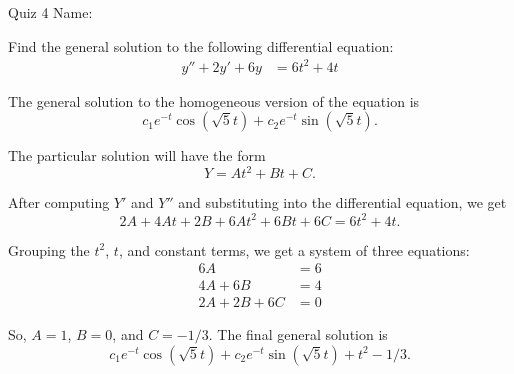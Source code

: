 \documentclass[answers,addpoints,12pt]{exam}
\begin{document}
\noindent
Quiz 4 \hfill Name: \hrulefill

\bigskip\bigskip


\noindent Find the general solution to the following differential equation:
\begin{align*}
	y'' + 2y' + 6y &=  6t^2+4t
\end{align*}

\begin{solution}
The general solution to the homogeneous version of the equation is
\begin{equation*}
	c_1 e^{-t} \cos(\sqrt 5 t) + c_2 e^{-t} \sin(\sqrt 5 t).
\end{equation*}

The particular solution will have the form
\begin{equation*}
	Y = At^2 + Bt + C.
\end{equation*}

After computing $Y'$ and $Y''$ and substituting into the differential equation, we get
\begin{equation*}
	2A + 4At + 2B + 6At^2 + 6Bt + 6C = 6t^2 + 4t.
\end{equation*}

Grouping the $t^2$, $t$, and constant terms, we get a system of three equations:
\begin{align*}
	6A \phantom{{}+0B+0C} &= 6 \\
	4A + 6B \phantom{{}+0C} &= 4\\
	2A + 2B + 6C &= 0
\end{align*}

So, $A=1$, $B=0$, and $C=-1/3$. The final general solution is
\begin{equation*}
	c_1 e^{-t} \cos(\sqrt 5 t) + c_2 e^{-t} \sin(\sqrt 5 t) + t^2 - 1/3.
\end{equation*}
\end{solution}
\end{document}
